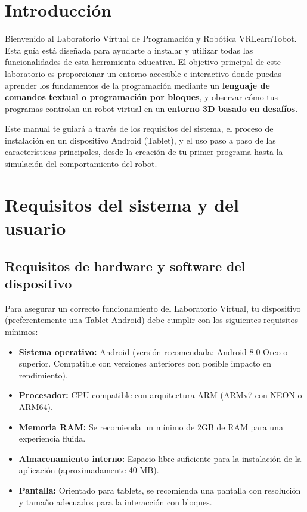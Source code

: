 
\section{Introducción}
Bienvenido al Laboratorio Virtual de Programación y Robótica VRLearnTobot. Esta guía está diseñada para ayudarte a instalar y utilizar todas las funcionalidades de esta herramienta educativa. El objetivo principal de este laboratorio es proporcionar un entorno accesible e interactivo donde puedas aprender los fundamentos de la programación mediante un \textbf{lenguaje de comandos textual o programación por bloques}, y observar cómo tus programas controlan un robot virtual en un \textbf{entorno 3D basado en desafíos}.

Este manual te guiará a través de los requisitos del sistema, el proceso de instalación en un dispositivo Android (Tablet), y el uso paso a paso de las características principales, desde la creación de tu primer programa hasta la simulación del comportamiento del robot.

\section{Requisitos del sistema y del usuario} 

\subsection{Requisitos de hardware y software del dispositivo}
Para asegurar un correcto funcionamiento del Laboratorio Virtual, tu dispositivo (preferentemente una Tablet Android) debe cumplir con los siguientes requisitos mínimos:
\begin{itemize}
	\item \textbf{Sistema operativo:} Android (versión recomendada: Android 8.0 Oreo o superior. Compatible con versiones anteriores con posible impacto en rendimiento). %
	\item \textbf{Procesador:} CPU compatible con arquitectura ARM (ARMv7 con NEON o ARM64).
	\item \textbf{Memoria RAM:} Se recomienda un mínimo de 2GB de RAM para una experiencia fluida.
	\item \textbf{Almacenamiento interno:} Espacio libre suficiente para la instalación de la aplicación (aproximadamente 40 MB). 
	\item \textbf{Pantalla:} Orientado para tablets, se recomienda una pantalla con resolución y tamaño adecuados para la interacción con bloques.
\end{itemize}


